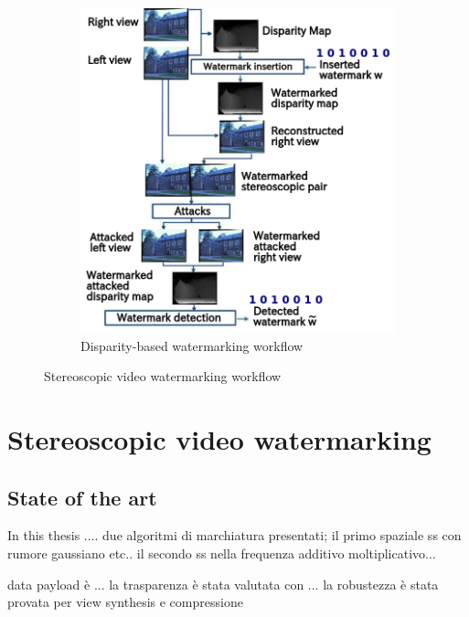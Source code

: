 \begin{figure}[h!]
\begin{subfigure}[]{0.4\textwidth}
\includegraphics[width=1.05\textwidth]{./img/disparity_domain.png}
\caption{\small{Disparity-based watermarking workflow}}
\label{fig:disp}
\end{subfigure}
\caption{\small{Stereoscopic video watermarking workflow}}
\end{figure}


\section{Stereoscopic video watermarking}

\subsection{State of the art}



\newpage
In this thesis ....
due algoritmi di marchiatura presentati; il primo spaziale ss con rumore gaussiano etc.. 
il secondo ss nella frequenza additivo moltiplicativo...


data payload è ...
la trasparenza è stata valutata con ...
la robustezza è stata provata per view synthesis e compressione



